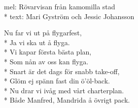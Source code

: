 \begin{SongText}[FLygturen]
    \begin{SongInfo}
        mel: Rövarvisan från kamomilla stad\\*%
        text: Mari Gyström och Jessic Johansson
    \end{SongInfo}
    \begin{SongVerse}
        Nu far vi ut på flygarfest,\\*%
        Ja vi ska ut å flyga.\\*%
        Vi kapar första bästa plan,\\*%
        Som nån av oss kan flyga.\\*%
        Snart är det dags för snabb take-off,\\*%
        Glöm ej spänn fast din ö'öl-back.\\*%
        Nu drar vi ivåg med vårt charterplan.\\*%
        Både Manfred, Mandrida å övrigt pack.
        

\end{SongVerse}
\end{SongText}
